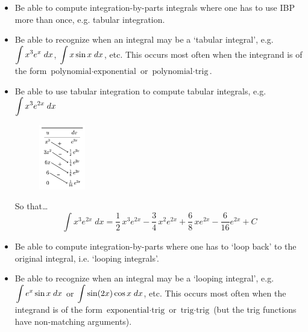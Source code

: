 \documentclass[11pt,letterpaper]{article}
\begin{document}
\begin{itemize}
\item Be able to compute integration-by-parts integrals where one has to use IBP more than once, e.g. tabular integration.

\item Be able to recognize when an integral may be a `tabular integral', e.g. $\displaystyle\int x^3 e^x \;dx$, $\displaystyle\int x \sin x \;dx$, etc. This occurs most often when the integrand is of the form $\text{polynomial} \cdot \text{exponential}$ or $\text{polynomial} \cdot \text{trig}$. 

\item Be able to use tabular integration to compute tabular integrals, e.g. $\displaystyle\int x^3 e^{2x} \;dx$
	\begin{figure}[H]
	\centering
	\includegraphics[width=0.19\textwidth]{images/tabular.png}
	\end{figure}
So that\dots
	\[
	\int x^3 e^{2x} \;dx= \dfrac{1}{2}\, x^3 e^{2x} - \dfrac{3}{4}\, x^2 e^{2x} + \dfrac{6}{8}\, x e^{2x} - \dfrac{6}{16} e^{2x} + C
	\]

\item Be able to compute integration-by-parts where one has to `loop back' to the original integral, i.e. `looping integrals'. 

\item Be able to recognize when an integral may be a `looping integral', e.g. $\displaystyle\int e^x \sin x \;dx$ or $\displaystyle\int \sin(2x) \cos x \;dx$, etc. This occurs most often when the integrand is of the form $\text{exponential} \cdot \text{trig}$ or $\text{trig} \cdot \text{trig}$ (but the trig functions have non-matching arguments).


\end{itemize}
\end{document}
